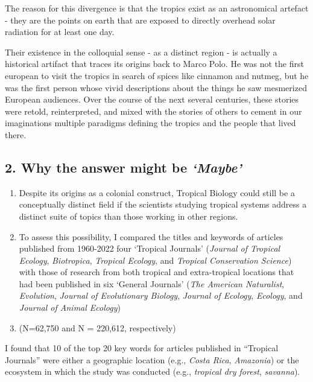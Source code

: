 \documentclass[
  12pt,
  man, donotrepeattitle]{apa6}
\begin{document}
The reason for this divergence is that the tropics exist as an astronomical artefact - they are the points on earth that are exposed to directly overhead solar radiation for at least one day.

Their existence in the colloquial sense - as a distinct region - is actually a historical artifact that traces its origins back to Marco Polo. He was not the first european to visit the tropics in search of spices like cinnamon and nutmeg, but he was the first person whose vivid descriptions about the things he saw mesmerized European audiences. Over the course of the next several centuries, these stories were retold, reinterpreted, and mixed with the stories of others to cement in our imaginations multiple paradigms defining the tropics and the people that lived there.

\hypertarget{why-the-answer-might-be-maybe}{%
\subsection{\texorpdfstring{2. Why the answer might be \emph{`Maybe'}}{2. Why the answer might be `Maybe'}}\label{why-the-answer-might-be-maybe}}

\begin{enumerate}
\def\labelenumi{\arabic{enumi}.}
\item
  Despite its origins as a colonial construct, Tropical Biology could still be a conceptually distinct field if the scientists studying tropical systems address a distinct suite of topics than those working in other regions.
\item
  To assess this possibility, I compared the titles and keywords of articles published from 1960-2022 four `Tropical Journals' (\emph{Journal of Tropical Ecology}, \emph{Biotropica}, \emph{Tropical Ecology}, and \emph{Tropical Conservation Science}) with those of research from both tropical and extra-tropical locations that had been published in six `General Journals' (\emph{The American Naturalist}, \emph{Evolution}, \emph{Journal of Evolutionary Biology}, \emph{Journal of Ecology}, \emph{Ecology}, and \emph{Journal of Animal Ecology})
\item
  (N=62,750 and N = 220,612, respectively)
\end{enumerate}

I found that 10 of the top 20 key words for articles published in ``Tropical Journals'' were either a geographic location (e.g., \emph{Costa Rica}, \emph{Amazonia}) or the ecosystem in which the study was conducted (e.g., \emph{tropical dry forest}, \emph{savanna}).
\end{document}
